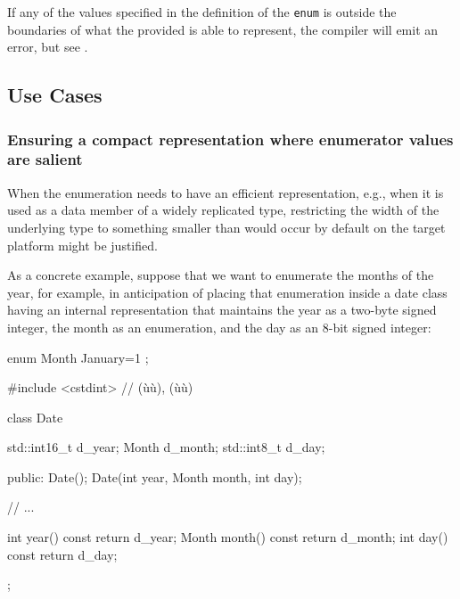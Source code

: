 \noindent If any of the values specified in the definition of the \lstinline!enum! is
outside the boundaries of what the provided  is
able to represent, the compiler will emit an error, but see . 

\subsection[Use Cases]{Use Cases}\label{use-cases}

\subsubsection[Ensuring a compact representation where enumerator values are salient]{Ensuring a compact representation where enumerator values are salient}\label{ensuring-a-compact-representation-where-enumerator-values-are-salient}

When the enumeration needs to have an efficient representation, e.g.,
when it is used as a data member of a widely replicated type,
restricting the width of the underlying type to something smaller than
would occur by default on the target platform might be justified.

As a concrete example, suppose that we want to enumerate the months of
the year, for example, in anticipation of placing that enumeration
inside a date class having an internal representation that maintains the
year as a two-byte signed integer, the month as an enumeration, and the
day as an 8-bit signed integer:

\begin{emcppshiddenlisting}[emcppsbatch=e1]
enum Month { January=1 };
\end{emcppshiddenlisting}
\begin{emcppslisting}[emcppsbatch=e1]
#include <cstdint>  // (ù{}ù), (ù{}ù)

class Date
{
    std::int16_t d_year;
    Month        d_month;
    std::int8_t  d_day;

public:
    Date();
    Date(int year, Month month, int day);

    // ...

    int year() const    { return d_year; }
    Month month() const { return d_month; }
    int day() const     { return d_day; }
};
\end{emcppslisting}

